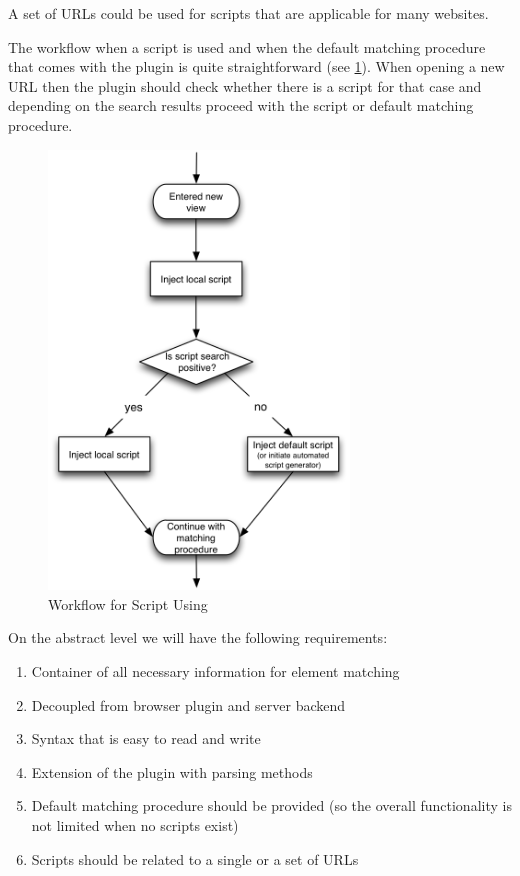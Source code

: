 A set of URLs could be used for scripts that are applicable for many websites. 

The workflow when a script is used and when the default matching procedure that comes with the plugin is quite straightforward (see \figurename \ref{script-usage-basic}). When opening a new URL then the plugin should check whether there is a script for that case and depending on the search results proceed with the script or default matching procedure.

\begin{figure}\centering
		\includegraphics[width=8cm]{images/script-usage-basic.png}
		\caption{Workflow for Script Using}
		\label{script-usage-basic}
\end{figure} 

On the abstract level we will have the following requirements:

\begin{enumerate}
	\item Container of all necessary information for element matching
	\item Decoupled from browser plugin and server backend
	\item Syntax that is easy to read and write
	\item Extension of the plugin with parsing methods
	\item Default matching procedure should be provided (so the overall functionality is not limited when no scripts exist)
	\item Scripts should be related to a single or a set of URLs
\end{enumerate}
